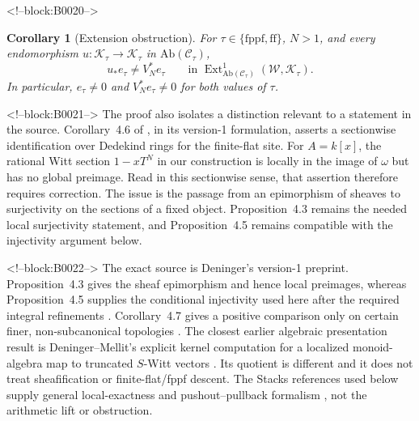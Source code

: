 \documentclass[11pt]{article}
\newtheorem{corollary}[theorem]{Corollary}
\theoremstyle{definition}
\newcommand{\Ext}{\operatorname{Ext}}
\newcommand{\Wsh}{\mathcal W}
\newcommand{\Ksh}{\mathcal K}
\newcommand{\ff}{\mathrm{ff}}
\newcommand{\fppf}{\mathrm{fppf}}
\begin{document}
<!--block:B0020-->
\begin{corollary}[Extension obstruction]\label{cor:ext}
For \(\tau\in\{\fppf,\ff\}\), \(N>1\), and every endomorphism
\(u\colon\Ksh_\tau\to\Ksh_\tau\) in
\(\mathrm{Ab}(\mathscr C_\tau)\),
\[
 u_*e_\tau\ne V_N^*e_\tau
 \qquad\text{in }
 \Ext^1_{\mathrm{Ab}(\mathscr C_\tau)}(\Wsh,\Ksh_\tau).
\]
In particular, \(e_\tau\ne0\) and \(V_N^*e_\tau\ne0\) for both values of
\(\tau\).
\end{corollary}

<!--block:B0021-->
The proof also isolates a distinction relevant to a statement in the
source.  Corollary~4.6 of
\cite[p.~23]{Deninger2025Rational}, in its version-1 formulation, asserts a
sectionwise identification over Dedekind rings for the finite-flat site.
For \(A=k[x]\), the rational Witt section \(1-xT^N\) in our construction is
locally in the image of \(\omega\) but has no global preimage.  Read in this
sectionwise sense, that assertion therefore requires correction.  The
issue is the passage from an epimorphism of sheaves to surjectivity on the
sections of a fixed object.  Proposition~4.3 remains the needed local
surjectivity statement, and Proposition~4.5 remains compatible with the
injectivity argument below.

<!--block:B0022-->
The exact source is Deninger's version-1 preprint.
Proposition~4.3 gives the sheaf epimorphism and hence local preimages,
whereas Proposition~4.5 supplies the conditional injectivity used here
after the required integral refinements
\cite[Props.~4.3 and~4.5, pp.~21--23]{Deninger2025Rational}.
Corollary~4.7 gives a positive comparison only on certain finer,
non-subcanonical topologies
\cite[Cor.~4.7, p.~24]{Deninger2025Rational}.  The closest earlier
algebraic presentation result is Deninger--Mellit's explicit kernel
computation for a localized monoid-algebra map to truncated \(S\)-Witt
vectors \cite[Thm.~1.1]{DeningerMellit2019}.  Its quotient is different
and it does not treat sheafification or finite-flat/fppf descent.  The
Stacks references used below supply general local-exactness and
pushout--pullback formalism
\cite[Tags 03CN, 010I, and 06XP]{StacksProject}, not the arithmetic lift
or obstruction.
\end{document}
